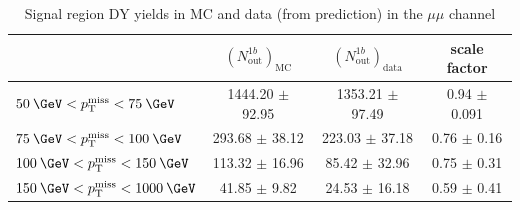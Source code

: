 \begin{table}[!htbp]
  \caption{Signal region DY yields in MC and data (from \Rinout prediction) in the $\mu\mu$ channel}
  \begin{tabular}{l|c|c|c}
    \hline
                                     & $(N^{1b}_\text{out})_\text{MC}$ & $(N^{1b}_\text{out})_\text{data}$ & scale factor \\ \hline
    $50\:\GeV<\ptmiss<75\:\GeV$      & 1444.20 $\pm$  92.95 & 1353.21 $\pm$ 97.49  & 0.94 $\pm$ 0.091 \\
    $75\:\GeV<\ptmiss<100\:\GeV$     & 293.68 $\pm$  38.12  & 223.03 $\pm$ 37.18 & 0.76 $\pm$ 0.16 \\
    $100\:\GeV<\ptmiss<150\:\GeV$    & 113.32 $\pm$  16.96  & 85.42 $\pm$ 32.96  & 0.75 $\pm$ 0.31 \\
    $150\:\GeV<\ptmiss<1000\:\GeV$   & 41.85 $\pm$   9.82   & 24.53 $\pm$ 16.18 & 0.59 $\pm$ 0.41 \\ \hline
  \end{tabular}
  \label{tab:Rinout_SF_mm}
\end{table}

